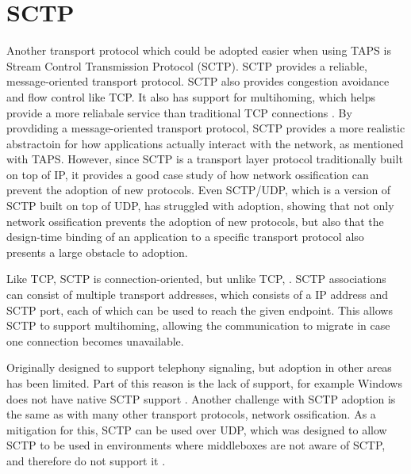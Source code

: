 \section{SCTP}
Another transport protocol which could be adopted easier
when using TAPS is Stream Control Transmission Protocol (SCTP).
SCTP provides a reliable, message-oriented transport protocol.
SCTP also provides congestion avoidance and flow control like TCP.
It also has support for multihoming, which helps provide a more
reliabale service than traditional TCP connections \cite{leungMultihomedCommunicationSCTP2013}.
By provdiding a message-oriented transport protocol, SCTP provides
a more realistic abstractoin for how applications actually interact
with the network, as mentioned with TAPS. 
However, since SCTP is a transport layer protocol traditionally
built on top of IP, it provides a good case study of how network
ossification can prevent the adoption of new protocols. Even
SCTP/UDP, which is a version of SCTP built on top of UDP, has
struggled with adoption, showing that not only network ossification
prevents the adoption of new protocols, but also that
the design-time binding of an application to a specific
transport protocol also presents a large obstacle to adoption.

Like TCP, SCTP is connection-oriented, but unlike TCP,
 \cite{leungMultihomedCommunicationSCTP2013}.
SCTP associations can consist of multiple transport addresses,
which consists of a IP address and SCTP port, each of which
can be used to reach the given endpoint. This allows SCTP to
support multihoming, allowing the communication to migrate
in case one connection becomes unavailable.

Originally designed to support telephony signaling, but
adoption in other areas has been limited. Part of
this reason is the lack of support, for example Windows does
not have native SCTP support \cite{hoggWhatStreamControl}.
Another challenge with SCTP adoption is the same as with
many other transport protocols, network ossification.
As a mitigation for this, SCTP can be used over UDP, which
was designed to allow SCTP to be used in environments
where middleboxes are not aware of SCTP, and therefore
do not support it \cite{tuexenUDPEncapsulationStream2013}.

